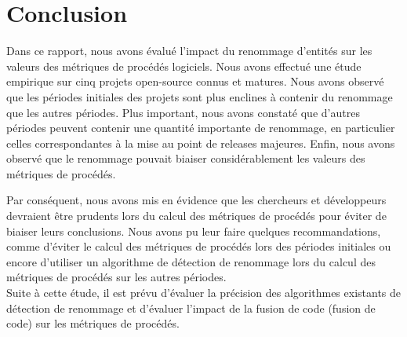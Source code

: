 \section{Conclusion}
\label{sec:conclusion}

Dans ce rapport, nous avons évalué l'impact du renommage d'entités sur les valeurs des métriques de procédés logiciels. Nous avons effectué une étude empirique sur cinq projets open-source connus et matures. Nous avons observé que les périodes initiales des projets sont plus enclines à contenir du renommage que les autres périodes. Plus important, nous avons constaté que d'autres périodes peuvent contenir une quantité importante de renommage, en particulier celles correspondantes à la mise au point de releases majeures. Enfin, nous avons observé que le renommage pouvait biaiser considérablement les valeurs des métriques de procédés. 

Par conséquent, nous avons mis en évidence que les chercheurs et développeurs devraient être prudents lors du calcul des métriques de procédés pour éviter de biaiser leurs conclusions. Nous avons pu leur faire quelques recommandations, comme d’éviter le calcul des métriques de procédés lors des périodes initiales ou encore d’utiliser un algorithme de détection de renommage lors du calcul des métriques de procédés sur les autres périodes.\\

Suite à cette étude, il est prévu d'évaluer la précision des algorithmes existants de détection de renommage et d'évaluer l'impact de la fusion de code (fusion de code) sur les métriques de procédés.\\
